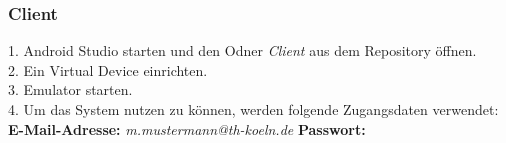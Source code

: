 	  \subsubsection{Client}
	  1. Android Studio starten und den Odner \textit{Client} aus dem Repository öffnen.\\
	  2. Ein Virtual Device einrichten.\\
	  3. Emulator starten.\\
	  4. Um das System nutzen zu können, werden folgende Zugangsdaten verwendet:\newline
	  \textbf{E-Mail-Adresse: }\textit{\glqq m.mustermann@th-koeln.de\grqq{}} \newline
	  \textbf{Passwort: }\textit{\grqq{}}
	
